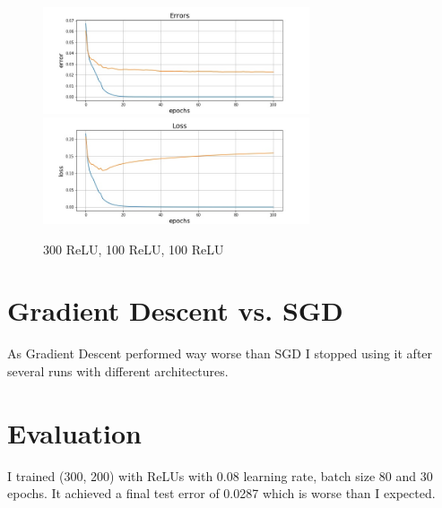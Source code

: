 \documentclass[
        a4paper,
        10pt,
        parskip = full,    %
    ]{scrartcl}
\begin{document}
\begin{figure}[H]
	\centering
	\includegraphics[width=0.7\textwidth]{../images/nn_300r100r100r_Errors.jpg}
	\includegraphics[width=0.7\textwidth]{../images/nn_300r100r100r_Losses.jpg}	
	\caption{300 ReLU, 100 ReLU, 100 ReLU}
	\label{nn_300r100r100r}
\end{figure}

\section{Gradient Descent vs. SGD}

As Gradient Descent performed way worse than SGD I stopped using it after several runs with different architectures.

\section{Evaluation}

I trained (300, 200) with ReLUs with 0.08 learning rate, batch size 80 and 30 epochs. It achieved a final test error of 0.0287 which is worse than I expected. 
\end{document}
